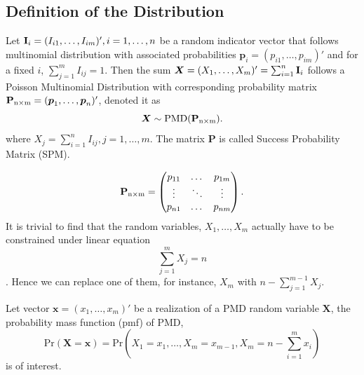 \documentclass[12pt]{article}
\newcommand{\Ivec}{{\boldsymbol{\rm I}}}
\newcommand{\Xmat}{\mathbf{X}}
\newcommand{\Pmat}{\mathbf{P}}
\newcommand{\pvec}{\boldsymbol{p}}
\newcommand{\PMD}{\textrm{PMD}}
\newcommand{\Xvec}{\boldsymbol{X}}
\newcommand{\xvec}{\boldsymbol{x}}
\begin{document}
\subsection{Definition of the Distribution}

Let $\Ivec_{i} = (I_{i1}, \dots, I_{im})', i=1, \dots, n$ be a random indicator vector that follows multinomial distribution with associated probabilities $\pvec_{i} = (p_{i1}, \dots, p_{im})'$ and for a fixed $i$, $\sum_{j=1}^{m} I_{ij}=1$. Then the sum $\Xvec = (X_{1}, \dots, X_{m})'= \sum_{i=1}^{n}\Ivec_{i}$ follows a Poisson Multinomial Distribution with corresponding probability matrix $\Pmat_{\rm n \times m} = (\pvec_{1}, \dots, \pvec_{n})'$, denoted it as
$$\Xvec \sim \PMD(\Pmat_{\rm n\times m}).$$ where $X_{j} = \sum_{i=1}^{n} I_{ij}, j=1,\dots,m$. The matrix $\Pmat$ is called Success Probability Matrix (SPM).

\begin{equation*}
\Pmat_{\rm n \times m} = \begin{pmatrix}
p_{11} &  \dots & p_{1m} \\
\vdots & \ddots & \vdots \\
p_{n1} &  \dots & p_{nm} \\
\end{pmatrix}.
\end{equation*}
It is trivial to find that the random variables, $X_1, \dots, X_{m}$ actually have to be constrained under linear equation $$\sum_{j=1}^{m}X_{j} = n$$. Hence we can replace one of them, for instance, $X_m$ with $n-\sum_{j=1}^{m-1}X_j$.

Let vector $\xvec = (x_1,\dots,x_m)'$ be a realization of a $\PMD$ random variable $\Xmat$, the probability mass function (pmf) of PMD,
$$\text{Pr}(\Xmat=\xvec) = \text{Pr} \left( X_1 = x_1, \dots, X_m = x_{m-1}, X_{m} = n-\sum_{i=1}^{m}x_i \right)$$
is of interest. 
\end{document}
